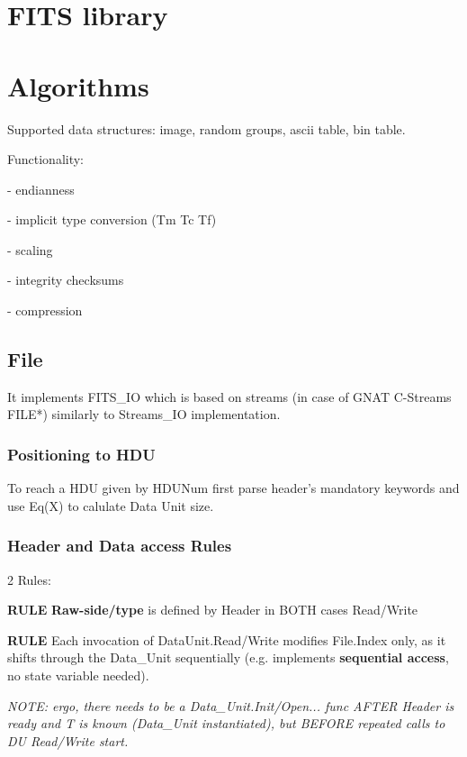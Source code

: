 \documentclass[a4paper,10pt]{article}
\begin{document}
\tableofcontents

\section{FITS library}


\section{Algorithms}

Supported data structures: image, random groups, ascii table, bin table.

Functionality:

- endianness

- implicit type conversion (Tm Tc Tf)

- scaling

- integrity checksums

- compression



\subsection{File}
It implements FITS\_IO which is based on streams (in case of GNAT C-Streams FILE*) similarly to Streams\_IO implementation.



\subsubsection{Positioning to HDU}

To reach a HDU given by HDUNum first parse header's mandatory keywords and use Eq(X)
to calulate Data Unit size. 


\subsubsection{Header and Data access Rules}

2 Rules:

\textbf{RULE} \textbf{Raw-side/type} is defined by Header in BOTH cases Read/Write

\textbf{RULE} Each invocation of DataUnit.Read/Write modifies File.Index only, as it shifts through the Data\_Unit sequentially (e.g. implements \textbf{sequential access}, no state variable needed).

\textit{NOTE: ergo, there needs to be a Data\_Unit.Init/Open... func AFTER Header is ready and T is known (Data\_Unit instantiated), but BEFORE repeated calls to DU Read/Write start.}
\end{document}
